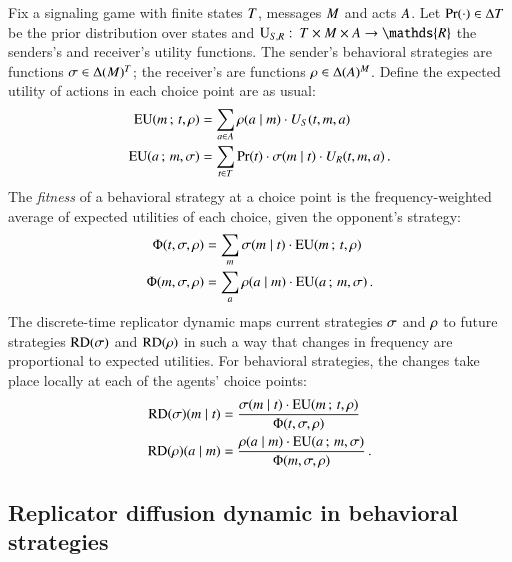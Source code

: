 Fix a signaling game with finite states $T$, messages $M$
and acts $A$. Let $\Pr(\cdot) \in \Delta{\ensuremath{T}}$ be the prior
distribution over states and $\Util_{\sen,\rec} \mycolon \States
\times \Messgs \times \Acts \rightarrow \mathds{R}$ the senders's and
receiver's utility functions. The sender's behavioral strategies are
functions $\sigma \in \Delta(M)^T$; the receiver's are
functions $\rho \in \Delta(A)^M$. Define the expected
utility of actions in each choice point are as usual:
\begin{align*}
  \mathrm{EU}(m \thinspace ; \thinspace t, \rho) & = \sum_{a \in A}
  \rho(a \mid m) \cdot U_S(t, m, a) \\
  \mathrm{EU}(a \thinspace ; \thinspace m, \sigma) & = \sum_{t \in
    T} \Pr(t) \cdot \sigma(m \mid t) \cdot
  U_R(t, m, a) \,.
\end{align*}
The \emph{fitness} of a behavioral strategy at a choice point is the
frequency-weighted average of expected utilities of each choice, given
the opponent's strategy:
\begin{align*}
  \Phi(t,\sigma, \rho) & = \sum_{m} \sigma(m \mid t) \cdot
\mathrm{EU}(m \thinspace ; \thinspace t,\rho) \\
\Phi(m,\sigma, \rho) & = \sum_{a} \rho(a \mid m)
\cdot \mathrm{EU}(a \thinspace ; \thinspace m,\sigma)\,.
\end{align*}
The discrete-time replicator dynamic maps current strategies $\sigma$
and $\rho$ to future strategies $\mathrm{RD}(\sigma)$ and $\mathrm{RD}(\rho)$
in such a way that changes in frequency are proportional to expected
utilities. For behavioral strategies, the changes take place locally
at each of the agents' choice points:
\begin{align*}
  \mathrm{RD}(\sigma)(m \mid t) & = \frac{\sigma(m \mid t) \cdot
    \mathrm{EU}(m \thinspace ; \thinspace t,\rho)} {\Phi(t,\sigma, \rho)} \\
    \mathrm{RD}(\rho)(a \mid m) & = \frac{\rho(a \mid m) \cdot
    \mathrm{EU}(a \thinspace ; \thinspace m,\sigma)} {\Phi(m,\sigma, \rho)}  \,.
\end{align*}


\subsection{Replicator diffusion dynamic in behavioral strategies}

